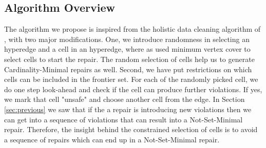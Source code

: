 %
%
%

\subsection{Algorithm Overview} \label{sec:algoOver}
The algorithm we propose is inspired from the holistic data cleaning algorithm of \cite{XuChu}, with two major modifications.
One, we introduce randomness in selecting an hyperedge and a cell in an hyperedge, where as \cite{XuChu} used minimum vertex cover to select cells to start the repair.
The random selection of cells help us to generate Cardinality-Minimal repairs as well.
Second, we have put restrictions on which cells can be included in the frontier set. 
For each of the randomly picked cell, we do one step look-ahead and check if the cell can produce further violations.
If yes, we mark that cell "unsafe" and choose another cell from the edge.
In Section \ref{sec:previous} we saw that if the a repair is introducing new violations then we can get into a sequence of violations that can result into a Not-Set-Minimal repair.
Therefore, the insight behind the constrained selection of cells is to avoid a sequence of repairs which can end up in a Not-Set-Minimal repair.


